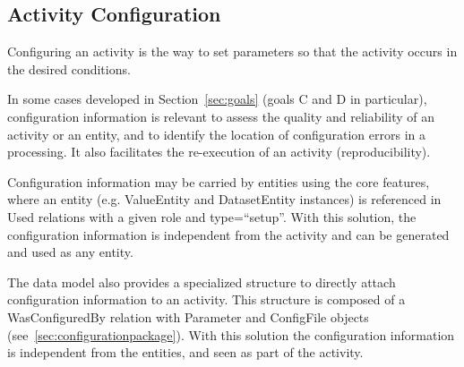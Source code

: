 
\subsection{Activity Configuration}
\label{sec:configuration}

Configuring an activity is the way to set parameters so that the activity occurs in the desired conditions.

In some cases developed in Section~\ref{sec:goals} (goals C and D in particular), configuration information is relevant to assess the quality and reliability of an activity or an entity, and to identify the location of configuration errors in a processing. It also facilitates the re-execution of an activity (reproducibility).

Configuration information may be carried by entities using the core features, where an entity (e.g. ValueEntity and DatasetEntity instances) is referenced in Used relations with a given role and type=“setup”. With this solution, the configuration information is independent from the activity and can be generated and used as any entity.

The data model also provides a specialized structure to directly attach configuration information to an activity. This structure is composed of a WasConfiguredBy relation with Parameter and ConfigFile objects (see~\ref{sec:configurationpackage}). With this solution the configuration information is independent from the entities, and seen as part of the activity.







